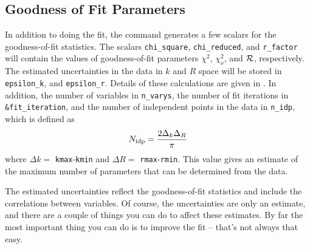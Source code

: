 \subsection{Goodness of Fit Parameters}
\label{Ch:FEFFIT-goodness}
{}
{}
{}
{}

In addition to doing the fit, the {} command generates a few
scalars for the goodness-of-fit statistics.  The scalars
{\texttt{chi\_square}}, {\texttt{chi\_reduced}}, and {\texttt{r\_factor}}
will contain the values of goodness-of-fit parameters $\chi^2$,
$\chi^2_{\nu}$, and ${\cal{R}}$, respectively.  The estimated uncertainties
in the data in $k$ and $R$ space will be stored in {\texttt{epsilon\_k}},
and {\texttt{epsilon\_r}}.  Details of these calculations are given in
{\XAIBook}.  In addition, the number of variables in {\texttt{n\_varys}},
the number of fit iterations in {\texttt{\&fit\_iteration}}, and the number
of independent points in the data in {\texttt{n\_idp}}, which is defined as
\[
  N_{\rm idp} = { {2  \Delta_k \Delta_R}\over{\pi}}
\]
\noindent 
where $\Delta k = $ {\tt{kmax}}-{\tt{kmin}} and $\Delta R = $
{\tt{rmax}}-{\tt{rmin}}.  This value gives an estimate of the maximum
number of parameters that can be determined from the data.

The estimated uncertainties reflect the goodness-of-fit statistics and
include the correlations between variables.  Of course, the uncertainties
are only an estimate, and there are a couple of things you can do to affect
these estimates.  By far the most important thing you can do is to improve
the fit -- that's not always that easy.

